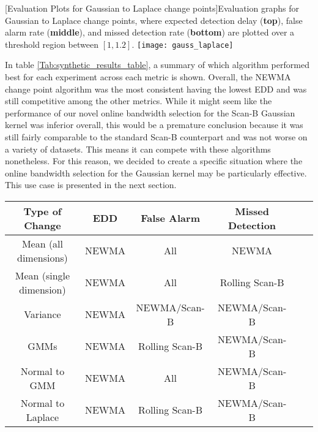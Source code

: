 \begin{minipage}{\textwidth}
\begin{center} 
[Evaluation Plots for Gaussian to Laplace change points]{Evaluation graphs for Gaussian to Laplace change points, where expected detection delay (\textbf{top}), false alarm rate (\textbf{middle}), and missed detection rate (\textbf{bottom}) are plotted over a threshold region between $[1,1.2]$. } 
\texttt{[image: gauss\_laplace]} 
\label{fig:gauss_laplace_results} 
\end{center}
\end{minipage}

In table \ref{Tab:synthetic_results_table}, a summary of which algorithm performed best for each experiment across each metric is shown. Overall, the NEWMA change point algorithm was the most consistent having the lowest EDD and was still competitive among the other metrics. While it might seem like the performance of our novel online bandwidth selection for the Scan-B Gaussian kernel was inferior overall, this would be a premature conclusion because it was still fairly comparable to the standard Scan-B counterpart and was not worse on a variety of datasets. This means it can compete with these algorithms nonetheless. For this reason, we decided to create a specific situation where the online bandwidth selection for the Gaussian kernel may be particularly effective. This use case is presented in the next section.

\begin{minipage}{\textwidth}
\begin{center}
\begin{tabular}{SSSSSS} \toprule
    {Type of Change} & {EDD} & {False Alarm} & {Missed Detection}  \\ \midrule
    {Mean (all dimensions)}  & {NEWMA} & {All} & {NEWMA}  \\
    {Mean (single dimension)}  & {NEWMA}  & {All} & {Rolling Scan-B}  \\
    {Variance}  & {NEWMA}  & {NEWMA/Scan-B}  & {NEWMA/Scan-B}   \\
    {GMMs}  & {NEWMA} & {Rolling Scan-B}  & {NEWMA/Scan-B}   \\ 
    {Normal to GMM}  & {NEWMA}  & {All}  & {NEWMA/Scan-B}   \\ 
    {Normal to Laplace} &  {NEWMA} & {Rolling Scan-B}  & {NEWMA/Scan-B}    \\ \bottomrule
\end{tabular}
 \label{Tab:synthetic_results_table}
\end{center}
\end{minipage}

